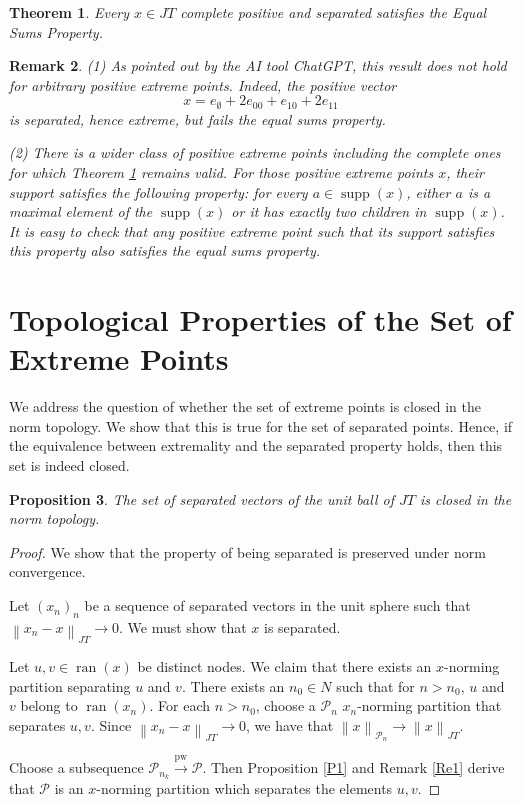 \documentclass[11pt,a4paper]{amsart}
\newtheorem{theorem}{Theorem}[section]
\newtheorem{proposition}[theorem]{Proposition}
\newtheorem{remark}[theorem]{Remark}
\newcommand{\JT}{JT}
\newcommand{\norm}[1]{\left\lVert#1\right\rVert}
\newcommand{\supp}{\operatorname{supp}}
\newcommand{\ran}{\operatorname{ran}}
\newcommand{\N}{N}
\begin{document}
\begin{theorem}\label{T5.18}
    Every $x \in \JT$ complete positive and separated satisfies the Equal Sums Property.
\end{theorem}
\begin{remark} 
  (1) As pointed out by the AI tool ChatGPT, this result does not hold for arbitrary positive extreme points. Indeed, the positive vector
  \[ x = e_\emptyset + 2e_{00} + e_{10} + 2e_{11} \]
  is separated, hence extreme, but fails the equal sums property.

  (2) There is a wider class of positive extreme points including the complete ones for which Theorem \ref{T5.18} remains valid. For those positive extreme points $x$, their support satisfies the following property: for every $a\in \supp(x)$,
  either $a$ is a maximal element of the $\supp(x)$ or it has exactly two children in $\supp(x)$. It is easy to check that any positive extreme point such that its support satisfies this property also satisfies the equal sums property.
\end{remark}

\section{Topological Properties of the Set of Extreme Points}

We address the question of whether the set of extreme points is closed in the norm topology. We show that this is true for the set of separated points. Hence, if the equivalence between extremality and the separated property holds, then this set is indeed closed.

\begin{proposition}
    The set of separated vectors of the unit ball of $\JT$ is closed in the norm topology.
\end{proposition}

\begin{proof}
    We show that the property of being separated is preserved under norm convergence.
    
    Let $(x_n)_n$ be a sequence of separated vectors in the unit sphere such that $\norm{x_n - x}_{\JT} \to 0$. We must show that $x$ is separated.
    
    Let $u, v \in \ran(x)$ be distinct nodes. We claim that there exists an $x$-norming partition separating $u$ and $v$.
    There exists an $n_0 \in \N$ such that for $n > n_0$, $u$ and $v$ belong to $\ran(x_n)$. For each $n > n_0$, choose a 
    $\mathcal{P}_n$ $x_n$-norming partition that separates $u, v$. Since $\norm{x_n - x}_{\JT} \to 0$, we have that 
    $\norm{x}_{\mathcal{P}_n} \to \norm{x}_{\JT}$.
  
  Choose a subsequence $\mathcal{P}_{n_k} \xrightarrow{\text{pw}} \mathcal{P}$. Then Proposition \ref{P1} and Remark 
  \ref{Re1} derive that $\mathcal{P}$ is an $x$-norming partition which separates the elements $u, v$.
\end{proof}
 
\end{document}
